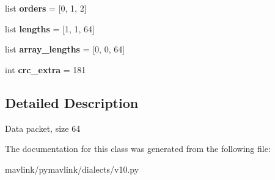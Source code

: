 \begin{DoxyCompactItemize}
\mbox{\label{classpymavlink_1_1dialects_1_1v10_1_1MAVLink__data64__message_aecf084b916efa482361ee9381b387861}} 
list {\bfseries orders} = \mbox{[}0, 1, 2\mbox{]}
\item 
\mbox{\label{classpymavlink_1_1dialects_1_1v10_1_1MAVLink__data64__message_a68859a4f3492f0ebdc3d0fb9854f4db9}} 
list {\bfseries lengths} = \mbox{[}1, 1, 64\mbox{]}
\item 
\mbox{\label{classpymavlink_1_1dialects_1_1v10_1_1MAVLink__data64__message_a21f361069062ed0fe149e30998cb63e0}} 
list {\bfseries array\+\_\+lengths} = \mbox{[}0, 0, 64\mbox{]}
\item 
\mbox{\label{classpymavlink_1_1dialects_1_1v10_1_1MAVLink__data64__message_a0d35e1a8535a2c1b7b6ae618b5aa9fce}} 
int {\bfseries crc\+\_\+extra} = 181
\end{DoxyCompactItemize}


\subsection{Detailed Description}
\begin{DoxyVerb}Data packet, size 64
\end{DoxyVerb}
 

The documentation for this class was generated from the following file\+:\begin{DoxyCompactItemize}
\item 
mavlink/pymavlink/dialects/v10.\+py\end{DoxyCompactItemize}

